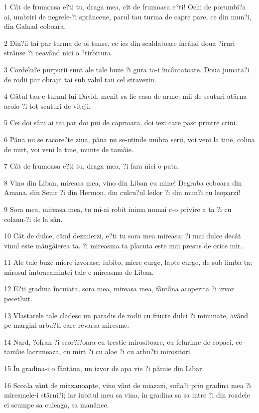 \par 1 Cât de frumoasa e?ti tu, draga mea, cît de frumoasa e?ti! Ochi de porumbi?a ai, umbriri de negrele-?i sprâncene, parul tau turma de capre pare, ce din mun?i, din Galaad coboara.
\par 2 Din?ii tai par turma de oi tunse, ce ies din scaldatoare facând doua ?iruri strânse ?i neavând nici o ?tirbitura.
\par 3 Cordelu?e purpurii sunt ale tale buze ?i gura ta-i încântatoare. Doua jumata?i de rodii par obrajii tai sub valul tau cel straveziu.
\par 4 Gâtul tau e turnul lui David, menit sa fie casa de arme: mii de scuturi atârna acolo ?i tot scuturi de viteji.
\par 5 Cei doi sâni ai tai par doi pui de caprioara, doi iezi care pasc printre crini.
\par 6 Pâna nu se racore?te ziua, pâna nu se-ntinde umbra serii, voi veni la tine, colina de mirt, voi veni la tine, munte de tamâie.
\par 7 Cât de frumoasa e?ti tu, draga mea, ?i fara nici o pata.
\par 8 Vino din Liban, mireasa mea, vino din Liban cu mine! Degraba coboara din Amana, din Senir ?i din Hermon, din culcu?ul leilor ?i din mun?i cu leoparzi!
\par 9 Sora mea, mireasa mea, tu mi-ai robit inima numai c-o privire a ta ?i cu colanu-?i de la sân.
\par 10 Cât de dulce, când dezmierzi, e?ti tu sora mea mireasa; ?i mai dulce decât vinul este mângâierea ta. ?i mireasma ta placuta este mai presus de orice mir.
\par 11 Ale tale buze miere izvorasc, iubito, miere curge, lapte curge, de sub limba ta; mirosul îmbracamintei tale e mireasma de Liban.
\par 12 E?ti gradina încuiata, sora mea, mireasa mea, fântâna acoperita ?i izvor pecetluit.
\par 13 Vlastarele tale cladesc un paradis de rodii cu fructe dulci ?i minunate, având pe margini arbu?ti care revarsa miresme:
\par 14 Nard, ?ofran ?i scor?i?oara cu trestie mirositoare, cu felurime de copaci, ce tamâie lacrimeaza, cu mirt ?i cu aloe ?i cu arbu?ti mirositori.
\par 15 În gradina-i o fântâna, un izvor de apa vie ?i pâraie din Libar.
\par 16 Scoala vânt de miazanoapte, vino vânt de miazazi, sufla?i prin gradina mea ?i miresmele-i stârni?i; iar iubitul meu sa vina, în gradina sa sa intre ?i din roadele ei scumpe sa culeaga, sa manânce.


